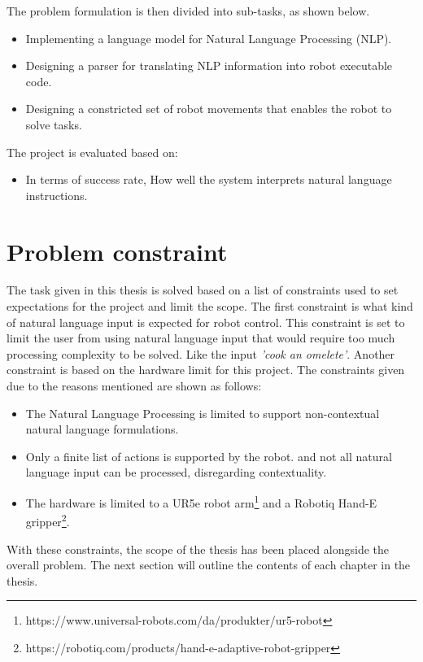 The problem formulation is then divided into sub-tasks, as shown below.
\begin{itemize}
    \item Implementing a language model for Natural Language Processing (NLP).
    \item Designing a parser for translating NLP information into robot executable code.
    \item Designing a constricted set of robot movements that enables the robot to solve tasks.

\end{itemize}

The project is evaluated based on:
\begin{itemize}
    \item In terms of success rate, How well the system interprets natural language instructions.

\end{itemize}

\section{Problem constraint}
The task given in this thesis is solved based on a list of constraints used to set expectations for the project and limit the scope. The first constraint is what kind of natural language input is expected for robot control. This constraint is set to limit the user from using natural language input that would require too much processing complexity to be solved. Like the input \textit{'cook an omelete'}. Another constraint is based on the hardware limit for this project. The constraints given due to the reasons mentioned are shown as follows:

\begin{itemize}
    \item The Natural Language Processing is limited to support non-contextual natural language formulations.
    \item Only a finite list of actions is supported by the robot. and not all natural language input can be processed, disregarding contextuality.
    \item The hardware is limited to a UR5e robot arm\footnote{https://www.universal-robots.com/da/produkter/ur5-robot} and a Robotiq Hand-E gripper\footnote{https://robotiq.com/products/hand-e-adaptive-robot-gripper}.
\end{itemize}

With these constraints, the scope of the thesis has been placed alongside the overall problem. The next section will outline the contents of each chapter in the thesis.

